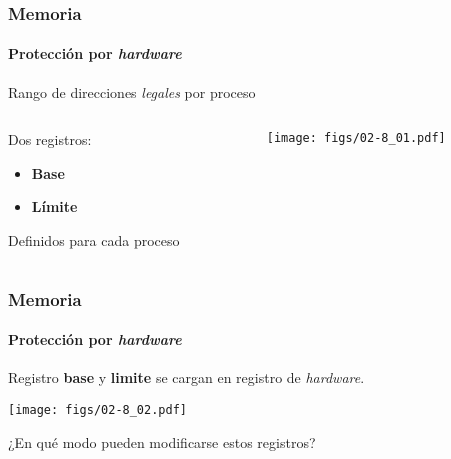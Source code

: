\documentclass[letter]{beamer}
\begin{document}
\begin{frame}
  \frametitle{Memoria}
  \framesubtitle{Protección por {\em hardware}}

  Rango de direcciones {\em legales} por proceso

  \begin{columns}[c]
    \begin{column}[T]{6cm}
      Dos registros:
        \begin{itemize}
          \item {\bf Base}
          \item {\bf Límite}
        \end{itemize}
      Definidos para cada proceso
    \end{column}
    \begin{column}[T]{5cm}
      \begin{center}
        \texttt{[image: figs/02-8\_01.pdf]}
      \end{center}
    \end{column}
  \end{columns}
    

\end{frame}
\begin{frame}
  \frametitle{Memoria}
  \framesubtitle{Protección por {\em hardware}}

  Registro {\bf base} y {\bf limite} se cargan en registro de {\em hardware}.

  \begin{center}
    \texttt{[image: figs/02-8\_02.pdf]}
  \end{center}

  ¿En qué modo pueden modificarse estos registros? 
  
\end{frame}
\end{document}
